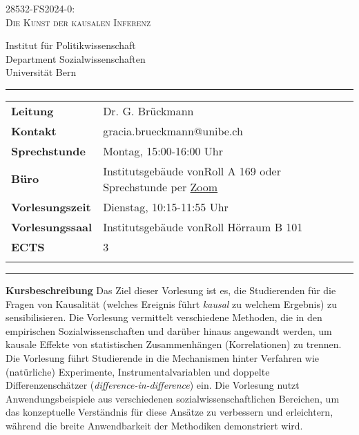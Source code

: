 \documentclass[12pt,a4paper]{article}
\begin{document}
\begin{center}
{\Large \textsc{28532-FS2024-0:\\
Die Kunst der kausalen Inferenz}}
\end{center}
\begin{center}
Institut für Politikwissenschaft \\
Department Sozialwissenschaften\\
Universität Bern\\
\end{center}

\begin{center}
\rule{\textwidth}{0.4pt}
\begin{minipage}[t]{\textwidth}
\medskip
\begin{tabular}{lll}
\textbf{Leitung} & Dr. G. Brückmann &  \medskip \\
\textbf{Kontakt} & gracia.brueckmann@unibe.ch & \medskip\\
\textbf{Sprechstunde} & Montag, 15:00-16:00 Uhr & \medskip\\
\textbf{Büro} & Institutsgebäude vonRoll A 169 oder Sprechstunde per \href{https://unibe-ch.zoom.us/my/graciabrueckmann}{Zoom} & \medskip \\
\textbf{Vorlesungszeit} & Dienstag, 10:15-11:55 Uhr & \medskip \\
\textbf{Vorlesungssaal} &  Institutsgebäude vonRoll Hörraum B 101 & \medskip \\
\textbf{ECTS} &  3 & \\ \smallskip
\end{tabular} \medskip
\end{minipage}
\rule{\textwidth}{0.4pt}
\end{center}
\vspace{.2cm}
\setlength{\unitlength}{1in}
\renewcommand{\arraystretch}{2}


\noindent\textbf{Kursbeschreibung} Das Ziel dieser Vorlesung ist es, die Studierenden für die Fragen von Kausalität (welches Ereignis führt \textit{kausal} zu welchem Ergebnis) zu sensibilisieren. Die Vorlesung vermittelt verschiedene Methoden, die in den empirischen Sozialwissenschaften und darüber hinaus angewandt werden, um kausale Effekte von statistischen Zusammenhängen (Korrelationen) zu trennen. Die Vorlesung führt Studierende in die Mechanismen hinter Verfahren wie (natürliche) Experimente, Instrumentalvariablen und doppelte Differenzenschätzer (\textit{difference-in-difference}) ein. Die Vorlesung nutzt Anwendungsbeispiele aus verschiedenen sozialwissenschaftlichen Bereichen, um das konzeptuelle Verständnis für diese Ansätze zu verbessern und erleichtern, während die breite Anwendbarkeit der Methodiken demonstriert wird.
\end{document}
